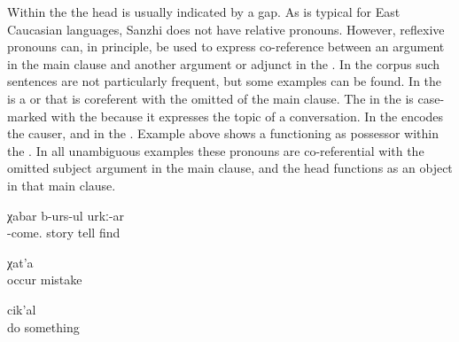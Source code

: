Within the  the head is usually indicated by a gap. As is typical for East Caucasian languages, Sanzhi does not have relative pronouns. However, reflexive pronouns can, in principle, be used to express co-reference between an argument in the main clause and another argument or adjunct in the . In the corpus such sentences are not particularly frequent, but some examples can be found. In  the  is a  or  that is coreferent with the omitted  of the main clause. The  in the  is case-marked with the  because it expresses the topic of a conversation. In  the  encodes the causer, and in  the . Example  above shows a  functioning as possessor within the . In all unambiguous examples these pronouns are co-referential with the omitted subject argument in the main clause, and the head functions as an object in that main clause.

\begin{exe}
	\ex	\label{ex:He is probably telling the story about what he had experienced}
		χabar	b-urs-ul	urkː-ar	\\
			-come.	story	tell	find\\
	\glt	{}

	\ex	\label{ex:the mistakes that were caused by him}
		χat'a\\
			occur	mistake\\
	\glt	{}

	\ex	\label{ex:(he is remembering) the things that he had done}
		cik'al\\
			do 	something\\
	\glt	{}
\end{exe}

